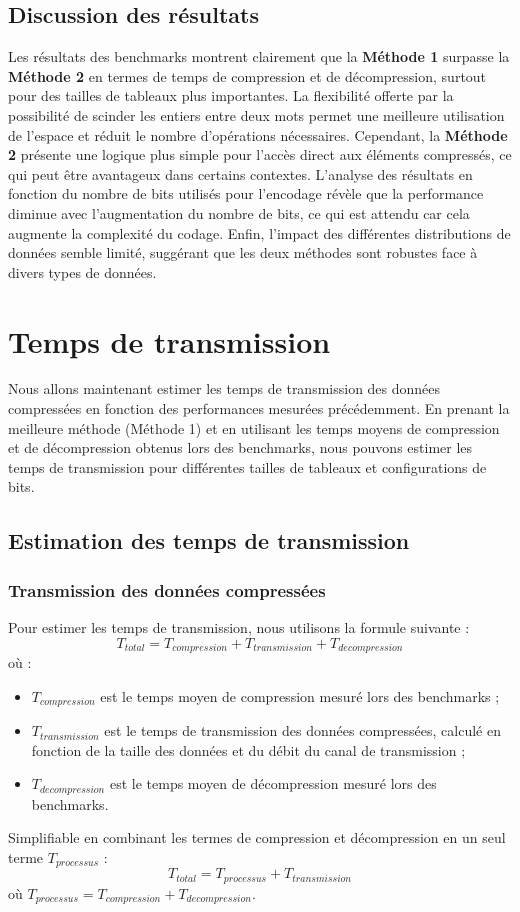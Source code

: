 \documentclass{rapportClass} %
\begin{document}
\section{Discussion des résultats}
Les résultats des benchmarks montrent clairement que la \textbf{Méthode 1} surpasse la \textbf{Méthode 2} en termes de temps de compression et de décompression,
surtout pour des tailles de tableaux plus importantes.  
La flexibilité offerte par la possibilité de scinder les entiers entre deux mots permet une meilleure utilisation de l’espace et réduit le nombre d’opérations nécessaires.
Cependant, la \textbf{Méthode 2} présente une logique plus simple pour l’accès direct aux éléments compressés, ce qui peut être avantageux dans certains contextes.  
L’analyse des résultats en fonction du nombre de bits utilisés pour l’encodage révèle que la performance diminue avec l’augmentation du nombre de bits,
ce qui est attendu car cela augmente la complexité du codage.  
Enfin, l’impact des différentes distributions de données semble limité, suggérant que les deux méthodes sont robustes face à divers types de données.

\chapter{Temps de transmission}
Nous allons maintenant estimer les temps de transmission des données compressées en fonction des performances mesurées précédemment.
En prenant la meilleure méthode (Méthode 1) et en utilisant les temps moyens de compression et de décompression obtenus lors des benchmarks,
nous pouvons estimer les temps de transmission pour différentes tailles de tableaux et configurations de bits.
\section{Estimation des temps de transmission}
\subsection{Transmission des données compressées}
Pour estimer les temps de transmission, nous utilisons la formule suivante :
\begin{equation}
    T_{total} = T_{compression} + T_{transmission} + T_{decompression}
\end{equation}
où :
\begin{itemize}
    \item $T_{compression}$ est le temps moyen de compression mesuré lors des benchmarks ;
    \item $T_{transmission}$ est le temps de transmission des données compressées, calculé en fonction de la taille des données et du débit du canal de transmission ;
    \item $T_{decompression}$ est le temps moyen de décompression mesuré lors des benchmarks.   
\end{itemize}
Simplifiable en combinant les termes de compression et décompression en un seul terme $T_{processus}$ :
\begin{equation}
    T_{total} = T_{processus} + T_{transmission}
\end{equation}
où $T_{processus} = T_{compression} + T_{decompression}$.
\end{document}

